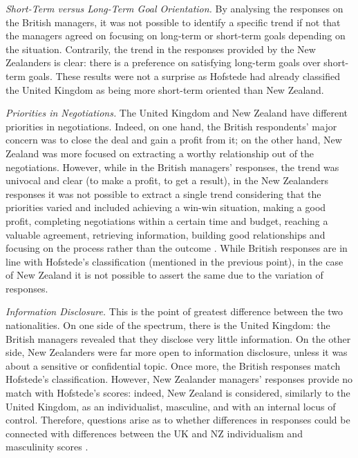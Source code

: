 \documentclass[../main.tex]{subfiles}
\begin{document}
\textit{Short-Term versus Long-Term Goal Orientation.} By analysing the responses on the British managers, it was not possible to identify a specific trend if not that the managers agreed on focusing on long-term or short-term goals depending on the situation. Contrarily, the trend in the responses provided by the New Zealanders is clear: there is a preference on satisfying long-term goals over short-term goals. These results were not a surprise as Hofstede had already classified the United Kingdom as being more short-term oriented than New Zealand.

\textit{Priorities in Negotiations.} The United Kingdom and New Zealand have different priorities in negotiations. Indeed, on one hand, the British respondents' major concern was to close the deal and gain a profit from it; on the other hand, New Zealand was more focused on extracting a worthy relationship out of the negotiations. However, while in the British managers' responses, the trend was univocal and clear (to make a profit, to get a result), in the New Zealanders responses it was not possible to extract a single trend considering that the priorities varied and included achieving a win-win situation, making a good profit, completing negotiations within a certain time and budget, reaching a valuable agreement, retrieving information, building good relationships and focusing on the process rather than the outcome \mancite\autocite[15]{zueva}. While British responses are in line with Hofstede's classification (mentioned in the previous point), in the case of New Zealand it is not possible to assert the same due to the variation of responses.

\textit{Information Disclosure.} This is the point of greatest difference between the two nationalities. On one side of the spectrum, there is the United Kingdom: the British managers revealed that they disclose very little information. On the other side, New Zealanders were far more open to information disclosure, unless it was about a sensitive or confidential topic. Once more, the British responses match Hofstede's classification. However, New Zealander managers' responses provide no match with Hofstede's scores: indeed, New Zealand is considered, similarly to the United Kingdom, as an individualist, masculine, and with an internal locus of control. Therefore, questions arise as to whether differences in responses could be connected with differences between the UK and NZ individualism and masculinity scores \mancite\autocite[16]{zueva}.
\end{document}
